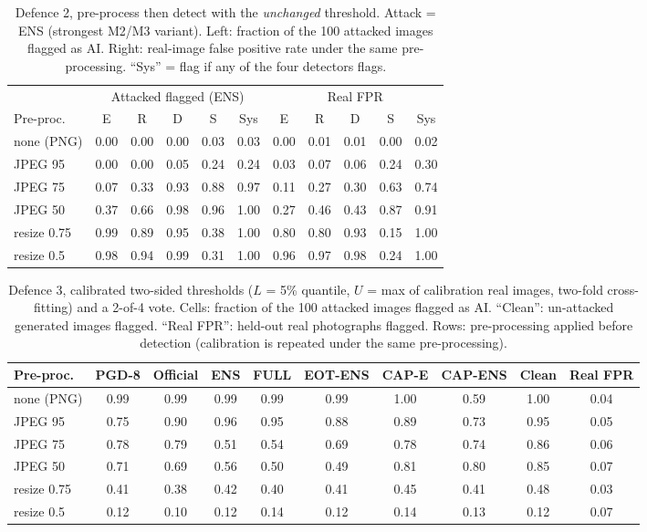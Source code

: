 \begin{table}[!t]
\caption{Defence 2, pre-process then detect with the \emph{unchanged} threshold. Attack = ENS (strongest M2/M3 variant). Left: fraction of the 100 attacked images flagged as AI. Right: real-image false positive rate under the same pre-processing. ``Sys'' = flag if any of the four detectors flags.}
\label{tab:preprocess}
\centering\footnotesize\setlength{\tabcolsep}{2.6pt}
\begin{tabular}{l ccccc ccccc}
\toprule
 & \multicolumn{5}{c}{Attacked flagged (ENS)} & \multicolumn{5}{c}{Real FPR} \\
\cmidrule(lr){2-6}\cmidrule(lr){7-11}
Pre-proc. & E & R & D & S & Sys & E & R & D & S & Sys \\
\midrule
none (PNG) & 0.00 & 0.00 & 0.00 & 0.03 & 0.03 & 0.00 & 0.01 & 0.01 & 0.00 & 0.02 \\
JPEG 95 & 0.00 & 0.00 & 0.05 & 0.24 & 0.24 & 0.03 & 0.07 & 0.06 & 0.24 & 0.30 \\
JPEG 75 & 0.07 & 0.33 & 0.93 & 0.88 & 0.97 & 0.11 & 0.27 & 0.30 & 0.63 & 0.74 \\
JPEG 50 & 0.37 & 0.66 & 0.98 & 0.96 & 1.00 & 0.27 & 0.46 & 0.43 & 0.87 & 0.91 \\
resize 0.75 & 0.99 & 0.89 & 0.95 & 0.38 & 1.00 & 0.80 & 0.80 & 0.93 & 0.15 & 1.00 \\
resize 0.5 & 0.98 & 0.94 & 0.99 & 0.31 & 1.00 & 0.96 & 0.97 & 0.98 & 0.24 & 1.00 \\
\bottomrule
\end{tabular}
\end{table}

\begin{table}[!t]
\caption{Defence 3, calibrated two-sided thresholds ($L$ = 5\% quantile, $U$ = max of calibration real images, two-fold cross-fitting) and a 2-of-4 vote. Cells: fraction of the 100 attacked images flagged as AI. ``Clean'': un-attacked generated images flagged. ``Real FPR'': held-out real photographs flagged. Rows: pre-processing applied before detection (calibration is repeated under the same pre-processing).}
\label{tab:calibrated}
\centering
\begin{tabular}{l ccccccc cc}
\toprule
Pre-proc. & PGD-8 & Official & ENS & FULL & EOT-ENS & CAP-E & CAP-ENS & Clean & Real FPR \\
\midrule
none (PNG) & 0.99 & 0.99 & 0.99 & 0.99 & 0.99 & 1.00 & 0.59 & 1.00 & 0.04 \\
JPEG 95 & 0.75 & 0.90 & 0.96 & 0.95 & 0.88 & 0.89 & 0.73 & 0.95 & 0.05 \\
JPEG 75 & 0.78 & 0.79 & 0.51 & 0.54 & 0.69 & 0.78 & 0.74 & 0.86 & 0.06 \\
JPEG 50 & 0.71 & 0.69 & 0.56 & 0.50 & 0.49 & 0.81 & 0.80 & 0.85 & 0.07 \\
resize 0.75 & 0.41 & 0.38 & 0.42 & 0.40 & 0.41 & 0.45 & 0.41 & 0.48 & 0.03 \\
resize 0.5 & 0.12 & 0.10 & 0.12 & 0.14 & 0.12 & 0.14 & 0.13 & 0.12 & 0.07 \\
\bottomrule
\end{tabular}
\end{table}

